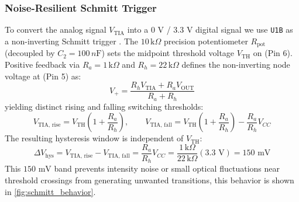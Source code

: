 \subsubsection{Noise-Resilient Schmitt Trigger}
To convert the analog signal $V_{\text{TIA}}$ into a $0\text{ V}$ / $3.3\text{ V}$ digital signal we use \texttt{U1B} as a non-inverting Schmitt trigger \cite[Chap 9.]{francoDesignOperationalAmplifiers2015}. The $10\,\text{k}\Omega$ precision potentiometer $R_{\text{pot}}$ (decoupled by $C_2 = 100\,n\text{F}$) sets the midpoint threshold voltage $V_{\text{TH}}$ on (Pin 6). Positive feedback via $R_a = 1\,\text{k}\Omega$ and $R_h = 22\,\text{k}\Omega$ defines the non-inverting node voltage at (Pin 5) as:
\begin{equation}
    V_+ = \frac{R_h V_{\text{TIA}} + R_a V_{\text{OUT}}}{R_a + R_h}
\end{equation}
yielding distinct rising and falling switching thresholds:
\begin{equation}
    V_{\text{TIA, rise}} = V_{\text{TH}}\left(1 + \frac{R_a}{R_h}\right), \qquad
    V_{\text{TIA, fall}} = V_{\text{TH}}\left(1 + \frac{R_a}{R_h}\right) - \frac{R_a}{R_h} V_{CC}
\end{equation}
The resulting hysteresis window is independent of $V_{\text{TH}}$:
\begin{equation}
    \Delta V_{\text{hys}} = V_{\text{TIA, rise}} - V_{\text{TIA, fall}} = \frac{R_a}{R_h} V_{CC} = \frac{1\,\text{k}\Omega}{22\,\text{k}\Omega}(3.3\text{ V}) = 150\text{ mV}
\end{equation}
This $150\text{ mV}$ band prevents intensity noise or small optical fluctuations near threshold crossings from generating unwanted transitions, this behavior is shown in \cref{fig:schmitt_behavior}.

